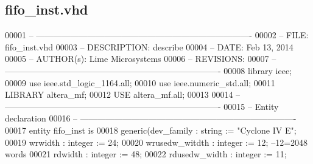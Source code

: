 \subsection{fifo\+\_\+inst.\+vhd}
\label{altera__inst_2fifo__inst_8vhd_source}

\begin{DoxyCode}
00001 \textcolor{keyword}{-- ---------------------------------------------------------------------------- }
00002 \textcolor{keyword}{-- FILE:    fifo\_inst.vhd}
00003 \textcolor{keyword}{-- DESCRIPTION: describe}
00004 \textcolor{keyword}{-- DATE:    Feb 13, 2014}
00005 \textcolor{keyword}{-- AUTHOR(s):   Lime Microsystems}
00006 \textcolor{keyword}{-- REVISIONS:}
00007 \textcolor{keyword}{-- ---------------------------------------------------------------------------- }
00008 \textcolor{vhdlkeyword}{library }\textcolor{keywordflow}{ieee};
00009 \textcolor{vhdlkeyword}{use }ieee.std\_logic\_1164.\textcolor{keywordflow}{all};
00010 \textcolor{vhdlkeyword}{use }ieee.numeric\_std.\textcolor{keywordflow}{all};
00011 \textcolor{vhdlkeyword}{LIBRARY }\textcolor{keywordflow}{altera\_mf};
00012 \textcolor{vhdlkeyword}{USE }\textcolor{keywordflow}{altera\_mf.all};
00013 
00014 \textcolor{keyword}{-- ----------------------------------------------------------------------------}
00015 \textcolor{keyword}{-- Entity declaration}
00016 \textcolor{keyword}{-- ----------------------------------------------------------------------------}
00017 \textcolor{keywordflow}{entity }fifo_inst \textcolor{keywordflow}{is}
00018   \textcolor{keywordflow}{generic}\textcolor{vhdlchar}{(}\textcolor{vhdlchar}{dev_family}         \textcolor{vhdlchar}{:} \textcolor{comment}{string}  \textcolor{vhdlchar}{:=} \textcolor{keyword}{"Cyclone IV E"};
00019           \textcolor{vhdlchar}{wrwidth}         \textcolor{vhdlchar}{:} \textcolor{comment}{integer} \textcolor{vhdlchar}{:=} \textcolor{vhdllogic}{}\textcolor{vhdllogic}{24};
00020           \textcolor{vhdlchar}{wrusedw_witdth}  \textcolor{vhdlchar}{:} \textcolor{comment}{integer} \textcolor{vhdlchar}{:=} \textcolor{vhdllogic}{}\textcolor{vhdllogic}{12};\textcolor{keyword}{ --12=2048 words }
00021           \textcolor{vhdlchar}{rdwidth}         \textcolor{vhdlchar}{:} \textcolor{comment}{integer} \textcolor{vhdlchar}{:=} \textcolor{vhdllogic}{}\textcolor{vhdllogic}{48};
00022           \textcolor{vhdlchar}{rdusedw_width}   \textcolor{vhdlchar}{:} \textcolor{comment}{integer} \textcolor{vhdlchar}{:=} \textcolor{vhdllogic}{}\textcolor{vhdllogic}{11};

\end{DoxyCode}
